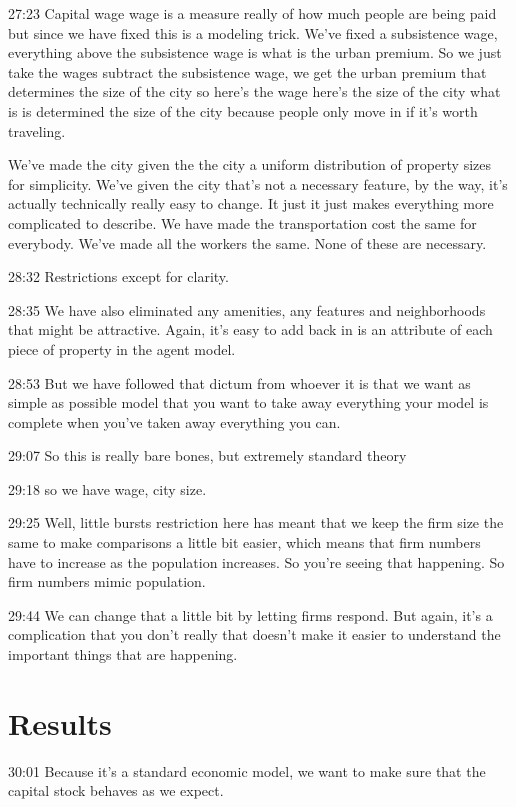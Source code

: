 \documentclass[]{article}
\begin{document}
27:23
Capital wage wage is a measure really of how much people are being paid but since we have fixed this is a modeling trick. We've fixed a subsistence wage, everything above the subsistence wage is what is the urban premium. So we just take the wages subtract the subsistence wage, we get the urban premium that determines the size of the city so here's the wage here's the size of the city what is is determined the size of the city because people only move in if it's worth traveling. 

We've made the city given the the city a uniform distribution of property sizes for simplicity. We've given the city that's not a necessary feature, by the way, it's actually technically really easy to change. It just it just makes everything more complicated to describe. We have made the transportation cost the same for everybody. We've made all the workers the same. None of these are necessary.

28:32
Restrictions except for clarity.

28:35
We have also eliminated any amenities, any features and neighborhoods that might be attractive. Again, it's easy to add back in is an attribute of each piece of property in the agent model.

28:53
But we have followed that dictum from whoever it is that we want as simple as possible model that you want to take away everything your model is complete when you've taken away everything you can.

29:07
So this is really bare bones, but extremely standard theory

29:18
so we have wage, city size.

29:25
Well, little bursts restriction here has meant that we keep the firm size the same to make comparisons a little bit easier, which means that firm numbers have to increase as the population increases. So you're seeing that happening. So firm numbers mimic population.

29:44
We can change that a little bit by letting firms respond. But again, it's a complication that you don't really that doesn't make it easier to understand the important things that are happening.


\section{Results}

30:01
Because it's a standard economic model, we want to make sure that the capital stock behaves as we expect.
\end{document}
